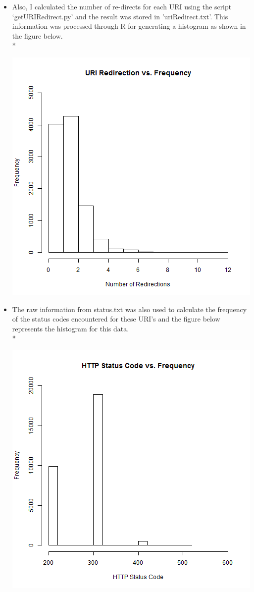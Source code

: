 \begin{itemize}
\item Also, I calculated the number of re-directs for each URI using the script `getURIRedirect.py' and the result was stored in 'uriRedirect.txt'. This information was processed through R for generating a histogram as shown in the figure below.\\*
	\begin{minipage}{\linewidth}
		\centering
		\includegraphics[scale=0.55]{figures/uriRedirect.png}
		\label{uriRedirect}
	\end{minipage}
\item The raw information from status.txt was also used to calculate the frequency of the status codes encountered for these URI's and the figure below represents the histogram for this data.\\*
	\begin{minipage}{\linewidth}
		\centering
		\includegraphics[scale=0.55]{figures/statusCode.png}

\end{minipage}
\end{itemize}
